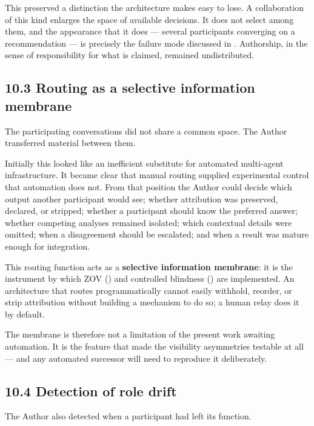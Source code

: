 This preserved a distinction the architecture makes easy to lose. A collaboration of this kind enlarges the space of available decisions. It does not select among them, and the appearance that it does — several participants converging on a recommendation — is precisely the failure mode discussed in . Authorship, in the sense of responsibility for what is claimed, remained undistributed.


\subsection*{10.3 Routing as a selective information membrane}
\label{sec:en:10.3}

The participating conversations did not share a common space. The Author transferred material between them.

Initially this looked like an inefficient substitute for automated multi-agent infrastructure. It became clear that manual routing supplied experimental control that automation does not. From that position the Author could decide which output another participant would see; whether attribution was preserved, declared, or stripped; whether a participant should know the preferred answer; whether competing analyses remained isolated; which contextual details were omitted; when a disagreement should be escalated; and when a result was mature enough for integration.

This routing function acts as a \textbf{selective information membrane}: it is the instrument by which ZOV () and controlled blindness () are implemented. An architecture that routes programmatically cannot easily withhold, reorder, or strip attribution without building a mechanism to do so; a human relay does it by default.

The membrane is therefore not a limitation of the present work awaiting automation. It is the feature that made the visibility asymmetries testable at all — and any automated successor will need to reproduce it deliberately.


\subsection*{10.4 Detection of role drift}
\label{sec:en:10.4}

The Author also detected when a participant had left its function.

